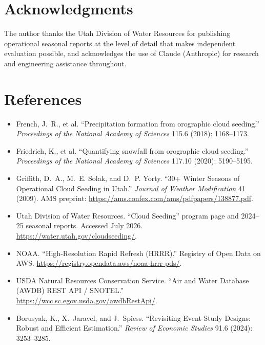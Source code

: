 \documentclass[9pt,twocolumn,twoside]{article}
\begin{document}
\section{Acknowledgments}
The author thanks the Utah Division of Water Resources for publishing
operational seasonal reports at the level of detail that makes independent
evaluation possible, and acknowledges the use of Claude (Anthropic) for
research and engineering assistance throughout.

\section{References}
\newcommand{\bibitemx}{\stepcounter{refc}\item[\arabic{refc}.]}
\begin{itemize}[leftmargin=1.6em,itemsep=2pt,parsep=0pt]\small
\bibitemx French, J.~R., et al. ``Precipitation formation from orographic
cloud seeding.'' \emph{Proceedings of the National Academy of Sciences}
115.6 (2018): 1168--1173.
\bibitemx Friedrich, K., et al. ``Quantifying snowfall from orographic cloud
seeding.'' \emph{Proceedings of the National Academy of Sciences} 117.10
(2020): 5190--5195.
\bibitemx Griffith, D.~A., M.~E. Solak, and D.~P. Yorty. ``30+ Winter Seasons
of Operational Cloud Seeding in Utah.'' \emph{Journal of Weather
Modification} 41 (2009). AMS preprint:
\url{https://ams.confex.com/ams/pdfpapers/138877.pdf}.
\bibitemx Utah Division of Water Resources. ``Cloud Seeding'' program page
and 2024--25 seasonal reports. Accessed July 2026.
\url{https://water.utah.gov/cloudseeding/}.
\bibitemx NOAA. ``High-Resolution Rapid Refresh (HRRR).'' Registry of Open
Data on AWS. \url{https://registry.opendata.aws/noaa-hrrr-pds/}.
\bibitemx USDA Natural Resources Conservation Service. ``Air and Water
Database (AWDB) REST API / SNOTEL.''
\url{https://wcc.sc.egov.usda.gov/awdbRestApi/}.
\bibitemx Borusyak, K., X.~Jaravel, and J.~Spiess. ``Revisiting Event-Study
Designs: Robust and Efficient Estimation.'' \emph{Review of Economic
Studies} 91.6 (2024): 3253--3285.
\end{itemize}
\end{document}
